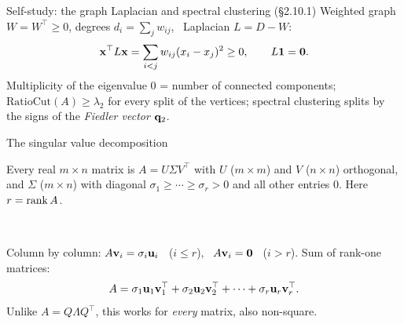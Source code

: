 \documentclass[aspectratio=1610,11pt]{beamer}
\begin{document}

\begin{frame}{Self-study: the graph Laplacian and spectral clustering (\S2.10.1)}
    \small
    Weighted graph $W = W^\top \geq 0$, degrees $d_i = \sum_j w_{ij}$, \ Laplacian $L = D - W$:
    \[\mathbf{x}^\top L\mathbf{x} = \sum_{i < j} w_{ij}(x_i - x_j)^2 \geq 0, \qquad L\mathbf{1} = \mathbf{0}.\]
    Multiplicity of the eigenvalue $0$ = number of connected components; \ $\mathrm{RatioCut}(A) \geq \lambda_2$ for every split of the vertices; spectral clustering splits by the signs of the \emph{Fiedler vector} $\mathbf{q}_2$.
    \\[0.3em]
    \centering{}
\end{frame}


\begin{frame}{The singular value decomposition}
    \begin{theorem}
        \small Every real $m \times n$ matrix is $A = U\Sigma V^\top$ with $U$ ($m \times m$) and $V$ ($n \times n$) orthogonal, and $\Sigma$ ($m \times n$) with diagonal $\sigma_1 \geq \cdots \geq \sigma_r > 0$ and all other entries $0$. Here $r = \operatorname{rank} A$.
    \end{theorem}
    \centering
    \\[0.4em]
    \raggedright\small
    Column by column: $A\mathbf{v}_i = \sigma_i\mathbf{u}_i$ \ ($i \leq r$), \ $A\mathbf{v}_i = \mathbf{0}$ \ ($i > r$). \quad Sum of rank-one matrices:
    \[A = \sigma_1\mathbf{u}_1\mathbf{v}_1^\top + \sigma_2\mathbf{u}_2\mathbf{v}_2^\top + \cdots + \sigma_r\mathbf{u}_r\mathbf{v}_r^\top.\]
    Unlike $A = Q\Lambda Q^\top$, this works for \emph{every} matrix, also non-square.
\end{frame}
\end{document}

